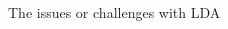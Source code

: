 \documentclass[notes,11pt, aspectratio=169]{beamer}
\begin{document}
\begin{frame}{The issues or challenges with LDA}
\begin{columns}[onlytextwidth, T]
\begin{column}{.5\textwidth}
      \end{column}%
    \end{columns}
  \end{frame}
\end{document}
